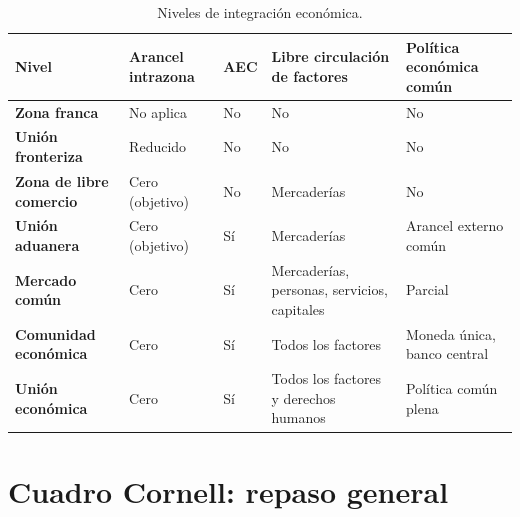 \documentclass[12pt,oneside]{book}
\begin{document}
\begin{table}[H]
\centering
\small
\begin{tabularx}{\textwidth}{
    >{\raggedright\arraybackslash}p{}
    >{\raggedright\arraybackslash}p{}
    >{\raggedright\arraybackslash}p{}
    >{\raggedright\arraybackslash}X
    >{\raggedright\arraybackslash}X
}
\toprule
\textbf{Nivel} & \textbf{Arancel intrazona} & \textbf{AEC} & \textbf{Libre circulación de factores} & \textbf{Política económica común} \\
\midrule
\textbf{Zona franca} & No aplica & No & No & No \\
\textbf{Unión fronteriza} & Reducido & No & No & No \\
\textbf{Zona de libre comercio} & Cero (objetivo) & No & Mercaderías & No \\
\textbf{Unión aduanera} & Cero (objetivo) & Sí & Mercaderías & Arancel externo común \\
\textbf{Mercado común} & Cero & Sí & Mercaderías, personas, servicios, capitales & Parcial \\
\textbf{Comunidad económica} & Cero & Sí & Todos los factores & Moneda única, banco central \\
\textbf{Unión económica} & Cero & Sí & Todos los factores y derechos humanos & Política común plena \\
\bottomrule
\end{tabularx}
\caption{Niveles de integración económica.}
\end{table}

\section{Cuadro Cornell: repaso general}
\end{document}
